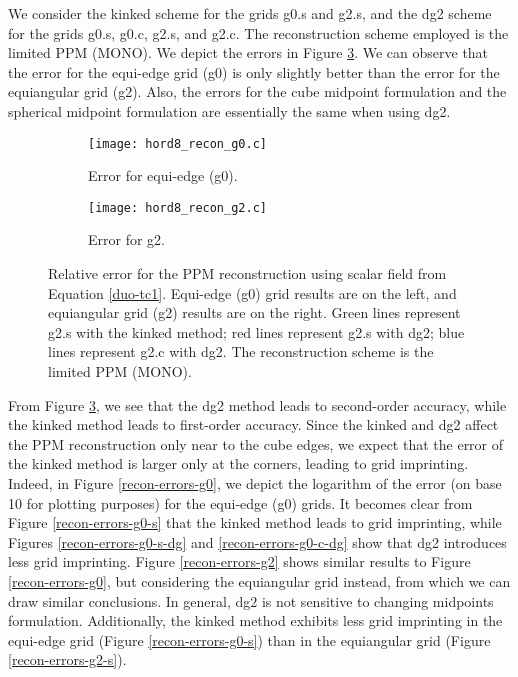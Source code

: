 We consider the kinked scheme for the grids g0.s and g2.s, and the dg2 scheme for the grids g0.s, g0.c, g2.s, and g2.c.
The reconstruction scheme employed is the limited PPM (MONO). We depict the errors in Figure \ref{cs-recon-error}.
We can observe that the error for the equi-edge grid (g0) is only slightly better than the error for the equiangular grid (g2).
Also, the errors for the cube midpoint formulation and the spherical midpoint formulation are essentially the same when using dg2.
\begin{figure}[!htb]
	\centering
	\begin{subfigure}{0.45\textwidth}
		\centering
		\texttt{[image: hord8\_recon\_g0.c]}
		\caption{Error for equi-edge (g0).\label{cs-recon-g0}}
	\end{subfigure}
	\begin{subfigure}{0.45\textwidth}
		\centering
		\texttt{[image: hord8\_recon\_g2.c]}
		\caption{Error for g2.\label{cs-recon-g2}}
	\end{subfigure}
	\caption{Relative error for the PPM reconstruction using scalar field from Equation \eqref{duo-tc1}.
	Equi-edge (g0) grid results are on the left, and equiangular grid (g2) results are on the right.
	Green lines represent g2.s with the kinked method;
	red lines represent g2.s with dg2;
	blue lines represent g2.c with dg2.
	The reconstruction scheme is the limited PPM (MONO).\label{cs-recon-error}}
\end{figure}

From Figure \ref{cs-recon-error}, we see that the dg2 method leads to second-order accuracy, while the kinked method leads to first-order accuracy.
Since the kinked and dg2 affect the PPM reconstruction only near to the cube edges, we expect that the error of the kinked  method is larger only at the corners, leading to grid imprinting.
Indeed, in Figure \ref{recon-errors-g0}, we depict the logarithm of the error (on base 10 for plotting purposes) for the equi-edge (g0) grids.
It becomes clear from Figure \ref{recon-errors-g0-s} that the kinked method leads to grid imprinting,
while Figures \ref{recon-errors-g0-s-dg} and \ref{recon-errors-g0-c-dg} show that dg2 introduces less grid imprinting.
Figure \ref{recon-errors-g2} shows similar results to Figure \ref{recon-errors-g0}, but considering the equiangular grid instead, from which we can draw similar conclusions.
In general, dg2 is not sensitive to changing midpoints formulation.
Additionally, the kinked method exhibits less grid imprinting in the equi-edge grid (Figure \ref{recon-errors-g0-s}) than in the equiangular grid (Figure \ref{recon-errors-g2-s}).

